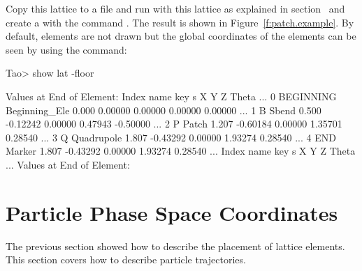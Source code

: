 \documentclass{hitec}
\newcommand{\Section}[1]{\section{#1}\vspace*{-1ex}}
\begin{document}
Copy this lattice to a file and run \tao with this lattice as explained in
section~ and create a  with the command 
. The result is shown in Figure~\ref{f:patch.example}.
By default,  elements are not drawn but the global coordinates
of the elements can be seen by using the  command:
{\small
\begin{code}
Tao> show lat -floor

      Values at End of Element:
 Index  name      key               s           X           Y           Z       Theta ...
     0  BEGINNING Beginning_Ele  0.000     0.00000     0.00000     0.00000     0.00000 ...
     1  B         Sbend          0.500    -0.12242     0.00000     0.47943    -0.50000 ...
     2  P         Patch          1.207    -0.60184     0.00000     1.35701     0.28540 ...
     3  Q         Quadrupole     1.807    -0.43292     0.00000     1.93274     0.28540 ...
     4  END       Marker         1.807    -0.43292     0.00000     1.93274     0.28540 ...
 Index  name      key                s           X           Y           Z       Theta ...
      Values at End of Element:
\end{code}}

\Section{Particle Phase Space Coordinates}

The previous section showed how to describe the placement of lattice elements. This section
covers how to describe particle trajectories. 
\end{document}
